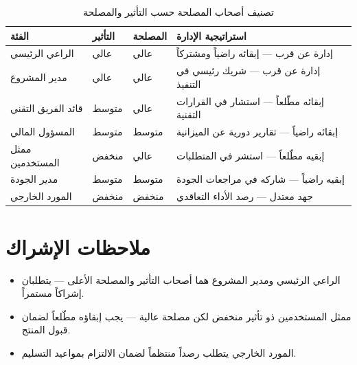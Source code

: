 \documentclass[11pt,a4paper]{article}
\begin{document}
\begin{table}[H]
\centering
\caption{تصنيف أصحاب المصلحة حسب التأثير والمصلحة}
\renewcommand{\arraystretch}{1.4}
\begin{tabularx}{\textwidth}{L{4cm} C{3cm} C{3cm} X}
\toprule
\textbf{الفئة} & \textbf{التأثير} & \textbf{المصلحة} & \textbf{استراتيجية الإدارة} \\
\midrule
الراعي الرئيسي & عالي & عالي & إدارة عن قرب --- إبقائه راضياً ومشتركاً \\
مدير المشروع & عالي & عالي & إدارة عن قرب --- شريك رئيسي في التنفيذ \\
قائد الفريق التقني & متوسط & عالي & إبقائه مطّلعاً --- استشار في القرارات التقنية \\
المسؤول المالي & متوسط & متوسط & إبقائه راضياً --- تقارير دورية عن الميزانية \\
ممثل المستخدمين & منخفض & عالي & إبقيه مطّلعاً --- استشر في المتطلبات \\
مدير الجودة & متوسط & متوسط & إبقيه راضياً --- شاركه في مراجعات الجودة \\
المورد الخارجي & منخفض & منخفض & جهد معتدل --- رصد الأداء التعاقدي \\
\bottomrule
\end{tabularx}
\end{table}

\section{ملاحظات الإشراك}
\label{sec:notes}

\begin{itemize}
    \item الراعي الرئيسي ومدير المشروع هما أصحاب التأثير والمصلحة الأعلى --- يتطلبان إشراكاً مستمراً.
    \item ممثل المستخدمين ذو تأثير منخفض لكن مصلحة عالية --- يجب إبقاؤه مطّلعاً لضمان قبول المنتج.
    \item المورد الخارجي يتطلب رصداً منتظماً لضمان الالتزام بمواعيد التسليم.
\end{itemize}
\end{document}

